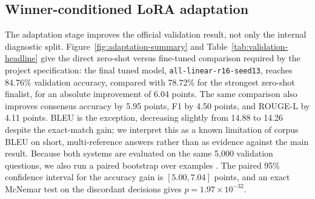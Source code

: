 \begin{table}[t]
    \centering
    \small
    \resizebox{\textwidth}{!}{}
    \caption{Main benchmark results. The table reports the best internal-dev screening configuration for each backbone, all promoted validation finalists, and the final tuned model. Exact-match accuracy is the primary score; consensus accuracy, F1, BLEU, METEOR, ROUGE-L, and judge similarity provide secondary semantic context. Bold entries mark the best value among validation-facing rows only; the internal-dev screening rows are not bolded against validation rows.}
    \label{tab:main-results}
\end{table}

\subsection{Winner-conditioned LoRA adaptation}

The adaptation stage improves the official validation result, not only the internal diagnostic split. Figure~\ref{fig:adaptation-summary} and Table~\ref{tab:validation-headline} give the direct zero-shot versus fine-tuned comparison required by the project specification: the final tuned model, \texttt{all-linear-r16-seed13}, reaches 84.76\% validation accuracy, compared with 78.72\% for the strongest zero-shot finalist, for an absolute improvement of 6.04 points. The same comparison also improves consensus accuracy by 5.95 points, F1 by 4.50 points, and ROUGE-L by 4.11 points. BLEU is the exception, decreasing slightly from 14.88 to 14.26 despite the exact-match gain; we interpret this as a known limitation of corpus BLEU on short, multi-reference answers rather than as evidence against the main result. Because both systems are evaluated on the same 5,000 validation questions, we also run a paired bootstrap over examples \citep{efron1979bootstrap}. The paired 95\% confidence interval for the accuracy gain is $[5.00, 7.04]$ points, and an exact McNemar test on the discordant decisions \citep{mcnemar1947note} gives $p=1.97\times10^{-32}$.

\begin{table}[t]
    \centering
    \small
    
    \caption{Zero-shot versus fine-tuned official validation comparison. Bold entries mark the stronger system-level metric. The paired gain is computed over the same 5,000 validation questions and is therefore a stronger test than comparing independent intervals alone.}
    \label{tab:validation-headline}
\end{table}

